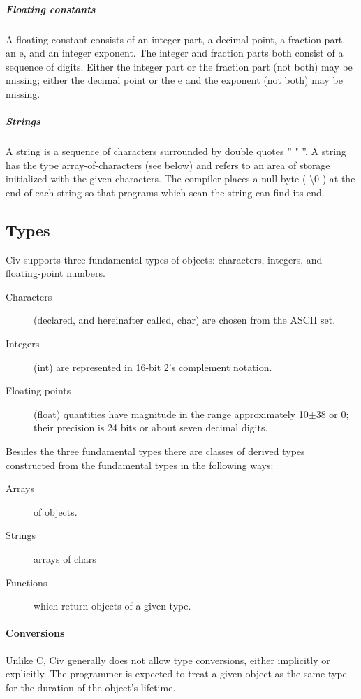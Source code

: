 \documentclass[a4paper]{article}
\begin{document}
\subparagraph{Floating constants}
A floating constant consists of an integer part, a decimal point, a fraction part, an e, and an integer exponent. The integer and fraction parts both consist of a sequence of digits. Either the integer part or the fraction part (not both) may be missing; either the decimal point or the e and the exponent (not both) may be missing.

\subparagraph{Strings}
A string is a sequence of characters surrounded by double quotes '' " ''. A string has the type array-of-characters (see below) and refers to an area of storage initialized with the given characters.  The compiler places a null byte ( \textbackslash0 ) at the end of each string so that programs which scan the string can find its end.

\subsection{Types}
Civ supports three fundamental types of objects: characters, integers, and floating-point numbers.
\begin{description}
    \item[Characters] (declared, and hereinafter called, char) are chosen from the ASCII set.
    \item[Integers] (int) are represented in 16-bit 2's complement notation.
    \item[Floating points] (float) quantities have magnitude in the range approximately 10$\pm$38 or 0; their precision is 24 bits or about seven decimal digits.
\end{description}
Besides the three fundamental types there are classes of derived types constructed from the fundamental types in the following ways:
\begin{description}
\item[Arrays] of objects.
\item[Strings] arrays of chars
\item[Functions] which return objects of a given type. 
\end{description}

\paragraph{Conversions}

Unlike C, Civ generally does not allow type conversions, either implicitly or explicitly. The programmer is expected to treat a given object as the same type for the duration of the object's lifetime.
\end{document}
